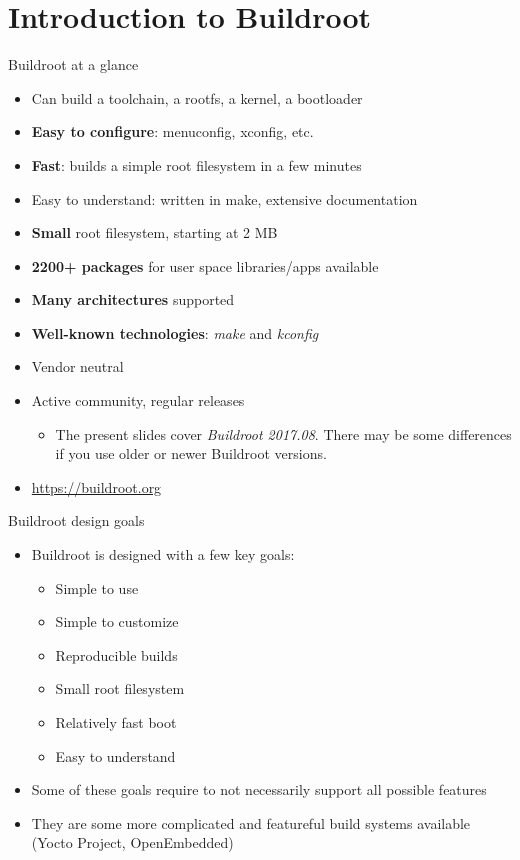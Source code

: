 \section{Introduction to Buildroot}

\begin{frame}{Buildroot at a glance}
  \begin{itemize}
  \item Can build a toolchain, a rootfs, a kernel, a bootloader
  \item {\bf Easy to configure}: menuconfig, xconfig, etc.
  \item {\bf Fast}: builds a simple root filesystem in a few minutes
  \item Easy to understand: written in make, extensive documentation
  \item {\bf Small} root filesystem, starting at 2 MB
  \item {\bf 2200+ packages} for user space libraries/apps available
  \item {\bf Many architectures} supported
  \item {\bf Well-known technologies}: {\em make} and {\em kconfig}
  \item Vendor neutral
  \item Active community, regular releases
    \begin{itemize}
    \item The present slides cover {\em Buildroot 2017.08}. There may
      be some differences if you use older or newer Buildroot versions.
    \end{itemize}
  \item \url{https://buildroot.org}
  \end{itemize}
\end{frame}

\begin{frame}{Buildroot design goals}
  \begin{itemize}
  \item Buildroot is designed with a few key goals:
    \begin{itemize}
    \item Simple to use
    \item Simple to customize
    \item Reproducible builds
    \item Small root filesystem
    \item Relatively fast boot
    \item Easy to understand
    \end{itemize}
  \item Some of these goals require to not necessarily support all
    possible features
  \item They are some more complicated and featureful build systems
    available (Yocto Project, OpenEmbedded)
  \end{itemize}
\end{frame}

